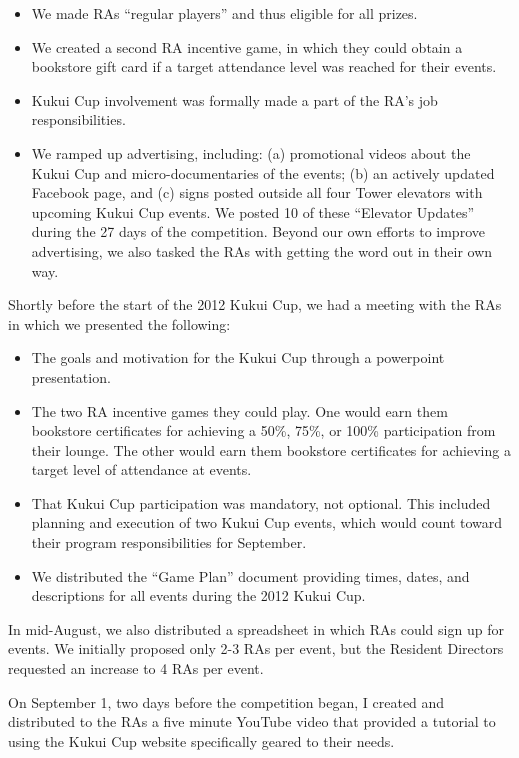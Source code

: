 \documentclass[]{IEEEconf}
\begin{document}
\begin{itemize}[noitemsep]
\item We made RAs ``regular players'' and thus eligible for all prizes. 

\item We created a second RA incentive game, in which they could obtain a
bookstore gift card if a target attendance level was reached for their events.  

\item Kukui Cup involvement was formally made a part of the RA's job responsibilities. 

\item We ramped up advertising, including: (a) promotional videos about the Kukui Cup and
micro-documentaries of the events; (b) an actively updated Facebook page, and (c) signs
posted outside all four Tower elevators with upcoming Kukui Cup events.  We posted 10 of
these ``Elevator Updates'' during the 27 days of the competition.  Beyond our own efforts
to improve advertising, we also tasked the RAs with getting the word out in their own
way. 
\end{itemize}

Shortly before the start of the 2012 Kukui Cup, we had a meeting with the RAs in which we presented the following:
\begin{itemize}[noitemsep]
\item The goals and motivation for the Kukui Cup through a powerpoint presentation.
\item The two RA incentive games they could play. One would earn them bookstore
  certificates for achieving a 50\%, 75\%, or 100\% participation from their lounge. The
  other would earn them bookstore certificates for achieving a target level of attendance
  at events. 
\item That Kukui Cup participation was mandatory, not optional.   This included planning and execution of two
  Kukui Cup events, which would count toward their program responsibilities for September.
\item We distributed the ``Game Plan'' document providing times, dates, and descriptions
  for all events during the 2012 Kukui Cup. 
\end{itemize}

In mid-August, we also distributed a spreadsheet in which RAs could sign up for events.  We initially
proposed only 2-3 RAs per event, but the Resident Directors requested an increase to 4 RAs per event. 

On September 1, two days before the competition began, I created and distributed to the
RAs a five minute YouTube video that provided a tutorial to using the Kukui Cup website
specifically geared to their needs.
\end{document}
